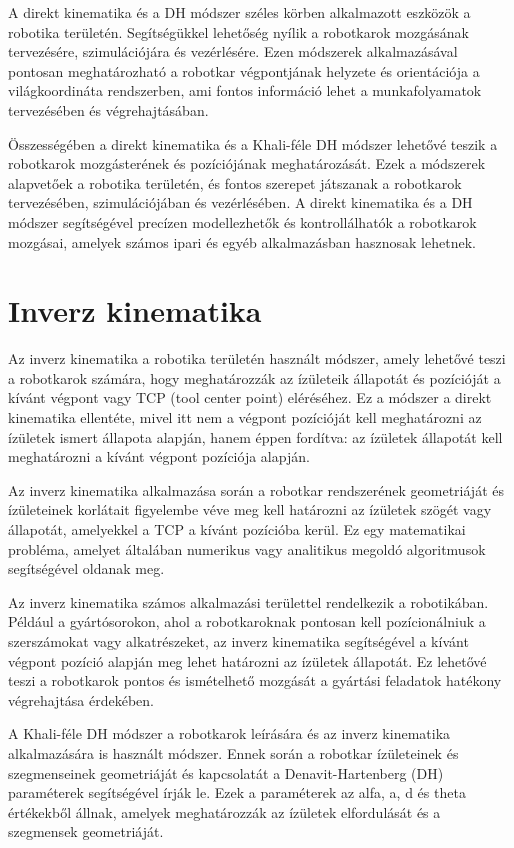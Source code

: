A direkt kinematika és a DH módszer széles körben alkalmazott eszközök a robotika területén. Segítségükkel lehetőség nyílik a robotkarok mozgásának tervezésére, szimulációjára és vezérlésére. Ezen módszerek alkalmazásával pontosan meghatározható a robotkar végpontjának helyzete és orientációja a világkoordináta rendszerben, ami fontos információ lehet a munkafolyamatok tervezésében és végrehajtásában.

Összességében a direkt kinematika és a Khali-féle DH módszer lehetővé teszik a robotkarok mozgásterének és pozíciójának meghatározását. Ezek a módszerek alapvetőek a robotika területén, és fontos szerepet játszanak a robotkarok tervezésében, szimulációjában és vezérlésében. A direkt kinematika és a DH módszer segítségével precízen modellezhetők és kontrollálhatók a robotkarok mozgásai, amelyek számos ipari és egyéb alkalmazásban hasznosak lehetnek.

\section{Inverz kinematika}
Az inverz kinematika a robotika területén használt módszer, amely lehetővé teszi a robotkarok számára, hogy meghatározzák az ízületeik állapotát és pozícióját a kívánt végpont vagy TCP (tool center point) eléréséhez. Ez a módszer a direkt kinematika ellentéte, mivel itt nem a végpont pozícióját kell meghatározni az ízületek ismert állapota alapján, hanem éppen fordítva: az ízületek állapotát kell meghatározni a kívánt végpont pozíciója alapján.

Az inverz kinematika alkalmazása során a robotkar rendszerének geometriáját és ízületeinek korlátait figyelembe véve meg kell határozni az ízületek szögét vagy állapotát, amelyekkel a TCP a kívánt pozícióba kerül. Ez egy matematikai probléma, amelyet általában numerikus vagy analitikus megoldó algoritmusok segítségével oldanak meg.

Az inverz kinematika számos alkalmazási területtel rendelkezik a robotikában. Például a gyártósorokon, ahol a robotkaroknak pontosan kell pozícionálniuk a szerszámokat vagy alkatrészeket, az inverz kinematika segítségével a kívánt végpont pozíció alapján meg lehet határozni az ízületek állapotát. Ez lehetővé teszi a robotkarok pontos és ismételhető mozgását a gyártási feladatok hatékony végrehajtása érdekében.

A Khali-féle DH módszer a robotkarok leírására és az inverz kinematika alkalmazására is használt módszer. Ennek során a robotkar ízületeinek és szegmenseinek geometriáját és kapcsolatát a Denavit-Hartenberg (DH) paraméterek segítségével írják le. Ezek a paraméterek az alfa, a, d és theta értékekből állnak, amelyek meghatározzák az ízületek elfordulását és a szegmensek geometriáját.

